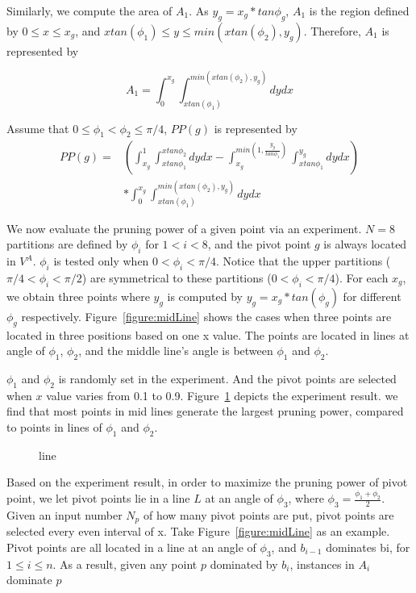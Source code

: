 Similarly, we compute the area of $A_1$. As $y_g = x_g * tan \phi_g$, $A_1$ is the region defined by $0 \le x \le x_g$, and $x tan(\phi_1) \le y \le min(x tan(\phi_2), y_g)$. Therefore, $A_1$ is represented by 

\begin{equation}
A_1 = \int_{0}^{x_g} \int_{x tan(\phi_1)}^{ min(x tan(\phi_2), y_g) } dydx
\end{equation}


Assume that $0 \leq \phi_1 < \phi_2 \leq \pi/4$, $PP(g)$ is represented by 
\begin{equation}
\begin{aligned}
PP(g) = & (\int_{x_g}^{1} \int_{x tan \phi_1}^{x tan \phi_2} dydx- \int_{x_g}^{min(1, \frac{y_g}{tan \phi_1})} \int_{x tan \phi_1}^{y_g} dydx)  \\
  & * \int_{0}^{x_g} \int_{x tan(\phi_1)}^{ min(x tan(\phi_2), y_g) } dydx
\end{aligned}
\end{equation}

We now evaluate the pruning power of a given point via an experiment. $N = 8$ partitions are defined by $\phi_i$ for $1< i <8$, and the pivot point $g$ is always located in $V^A$. $\phi_i$ is tested only when $0 < \phi_i < \pi/4$. Notice
that the upper partitions ($\pi/4 < \phi_i < \pi/2$) are symmetrical to these partitions ($0 < \phi_i < \pi/4$). For each $x_g$, we obtain three points where $y_g$ is computed by $y_g = x_g * tan(\phi_g)$ for different $\phi_g$ respectively. Figure~\ref{figure:midLine} shows the cases when three points are located in three positions based on one x value. The points are located in lines at angle of $\phi_1$, $\phi_2$, and the middle line's angle is between $\phi_1$ and $\phi_2$. 

$\phi_1$ and $\phi_2$ is randomly set in the experiment. And the pivot points are selected when $x$ value varies from 0.1 to 0.9. Figure~\ref{figure:testArea} depicts the experiment result. we find that most points in mid lines generate the largest pruning power, compared to points in lines of $\phi_1$ and $\phi_2$.


\begin{figure}[t]
\vspace{-15pt}
\centering
  \centerline{}
  \caption{line}
  \vspace{-15pt}
  \label{figure:testArea}
\end{figure}

Based on the experiment result, in order to maximize the pruning power of pivot point, we let pivot points lie in a line $L$ at an angle of $\phi_3$, where $\phi_3 = \frac{\phi_1 + \phi_2}{2}$. Given an input number $N_p$ of how many pivot points are put, pivot points are selected every even interval of x. Take Figure~\ref{figure:midLine} as an example. Pivot points are all located in a line at an angle of $\phi_3$, and $b_{i-1}$ dominates b{i}, for $1 \le i  \le n$. As a result, given any point $p$ dominated by $b_i$, instances in $A_i$ dominate $p$ 

